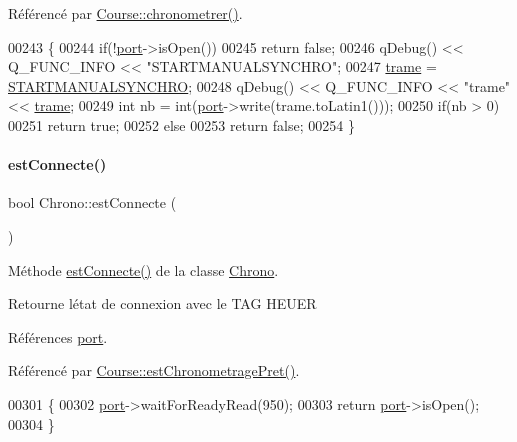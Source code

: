 Référencé par \hyperlink{class_course_a589447dd63dca89395119ffd4e4a8c8c}{Course\+::chronometrer()}.


\begin{DoxyCode}
00243 \{
00244     \textcolor{keywordflow}{if}(!\hyperlink{class_chrono_aca5fbe0eebd7f876f954d4a99c564167}{port}->isOpen())
00245         \textcolor{keywordflow}{return} \textcolor{keyword}{false};
00246     qDebug() << Q\_FUNC\_INFO << \textcolor{stringliteral}{"STARTMANUALSYNCHRO"};
00247     \hyperlink{class_chrono_a26f2155aa6e5ef4296e5456b64a713b5}{trame} = \hyperlink{chrono_8h_a0130f9324a15a83d5609c874891d9d1f}{STARTMANUALSYNCHRO};
00248     qDebug() << Q\_FUNC\_INFO << \textcolor{stringliteral}{"trame"} << \hyperlink{class_chrono_a26f2155aa6e5ef4296e5456b64a713b5}{trame};
00249     \textcolor{keywordtype}{int} nb = int(\hyperlink{class_chrono_aca5fbe0eebd7f876f954d4a99c564167}{port}->write(trame.toLatin1()));
00250     \textcolor{keywordflow}{if}(nb > 0)
00251         \textcolor{keywordflow}{return} \textcolor{keyword}{true};
00252     \textcolor{keywordflow}{else}
00253         \textcolor{keywordflow}{return} \textcolor{keyword}{false};
00254 \}
\end{DoxyCode}
\mbox{\label{class_chrono_aaad6d9079f2de1c09092f97614009f62}} 
\paragraph{\texorpdfstring{est\+Connecte()}{estConnecte()}}
{\footnotesize\ttfamily bool Chrono\+::est\+Connecte (\begin{DoxyParamCaption}{ }\end{DoxyParamCaption})}



Méthode \hyperlink{class_chrono_aaad6d9079f2de1c09092f97614009f62}{est\+Connecte()} de la classe \hyperlink{class_chrono}{Chrono}. 

Retourne l\textquotesingle{}état de connexion avec le T\+AG H\+E\+U\+ER 

Références \hyperlink{class_chrono_aca5fbe0eebd7f876f954d4a99c564167}{port}.



Référencé par \hyperlink{class_course_a44a14d431bd64a507f2c2aa5f465b1b0}{Course\+::est\+Chronometrage\+Pret()}.


\begin{DoxyCode}
00301 \{
00302     \hyperlink{class_chrono_aca5fbe0eebd7f876f954d4a99c564167}{port}->waitForReadyRead(950);
00303     \textcolor{keywordflow}{return} \hyperlink{class_chrono_aca5fbe0eebd7f876f954d4a99c564167}{port}->isOpen();
00304 \}
\end{DoxyCode}
\mbox{\label{class_chrono_ae7c3c8494ace02f4c9dd714f6f0e574a}} 

